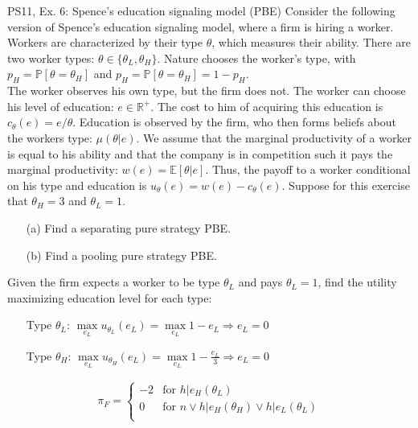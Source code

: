 \begin{frame}{PS11, Ex. 6: Spence’s education signaling model (PBE)}
    Consider the following version of Spence’s education signaling model, where a firm is hiring a worker. Workers are characterized by their type $\theta$, which measures their ability. There are two worker types: $\theta\in\{\theta_L,\theta_H\}$. Nature chooses the worker’s type, with $p_H=\mathbb{P}[\theta=\theta_H]$ and $p_H=\mathbb{P}[\theta=\theta_H]=1-p_H$.\\
    The worker observes his own type, but the firm does not. The worker can choose his level of education: $e\in\mathbb{R}^{+}$. The cost to him of acquiring this education is $c_\theta(e)=e/\theta$. Education is observed by the firm, who then forms beliefs about the workers type: $\mu(\theta|e)$. We assume that the marginal productivity of a worker is equal to his ability and that the company is in competition such it pays the marginal productivity: $w(e)=\mathbb{E}[\theta|e]$. Thus, the payoff to a worker conditional on his type and education is $u_\theta(e)=w(e)-c_\theta(e)$. Suppose for this exercise that $\theta_H=3$ and $\theta_L=1$.\vspace{-8pt}
    \begin{multicols}{2}
      \begin{itemize}
        \item[(a)] Find a separating pure strategy PBE.
        \item[(b)] Find a pooling pure strategy PBE.
      \end{itemize}\vspace{-6pt}
      Given the firm expects a worker to be type $\theta_L$ and pays $\theta_L=1$, find the utility maximizing education level for each type:\vspace{-16pt}
      \begin{itemize}
        \item[Type $\theta_L$:] $\max\limits_{e_L}u_{\theta_L}(e_L)=\max\limits_{e_L}1-e_L\Rightarrow e_L=0$\\
        \item[Type $\theta_H$:] $\max\limits_{e_L}u_{\theta_H}(e_L)=\max\limits_{e_L}1-\frac{e_L}{3}\Rightarrow e_L=0$
      \end{itemize}\vspace{-8pt}
      \begin{align*}
        \pi_{F}=\left\{\begin{array}{rl}
           -2 & \text{for }h|e_H(\theta_L) \\
            0 & \text{for }n\vee h|e_H(\theta_H)\vee h|e_L(\theta_L) \\

\end{array}
\end{align*}
\end{multicols}
\end{frame}
